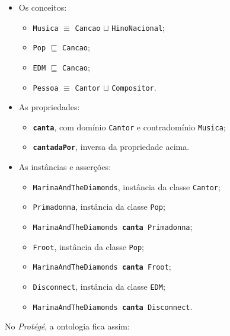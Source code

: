 \begin{itemize}
	\item Os conceitos: 
	\begin{itemize}
		\item \texttt{Musica} $ \equiv $ \texttt{Cancao} $ \sqcup $ \texttt{HinoNacional};
		\item \texttt{Pop} $ \sqsubseteq $ \texttt{Cancao};
		\item \texttt{EDM} $ \sqsubseteq $ \texttt{Cancao};
		\item \texttt{Pessoa} $ \equiv $ \texttt{Cantor} $ \sqcup $ \texttt{Compositor}.
	\end{itemize}
	\item As propriedades:
	\begin{itemize}
		\item \textbf{\texttt{canta}}, com domínio \texttt{Cantor} e contradomínio \texttt{Musica};
		\item \textbf{\texttt{cantadaPor}}, inversa da propriedade acima.
	\end{itemize}
	\item As instâncias e asserções:
	\begin{itemize}
		\item \texttt{MarinaAndTheDiamonds}, instância da classe \texttt{Cantor};
		\item \texttt{Primadonna}, instância da classe \texttt{Pop};
		\item \texttt{MarinaAndTheDiamonds \textbf{canta} Primadonna};
		\item \texttt{Froot}, instância da classe \texttt{Pop};
		\item \texttt{MarinaAndTheDiamonds \textbf{canta} Froot};
		\item \texttt{Disconnect}, instância da classe \texttt{EDM};
		\item \texttt{MarinaAndTheDiamonds \textbf{canta} Disconnect}.	
	\end{itemize}
\end{itemize}

No \textit{Protégé}, a ontologia fica assim:

